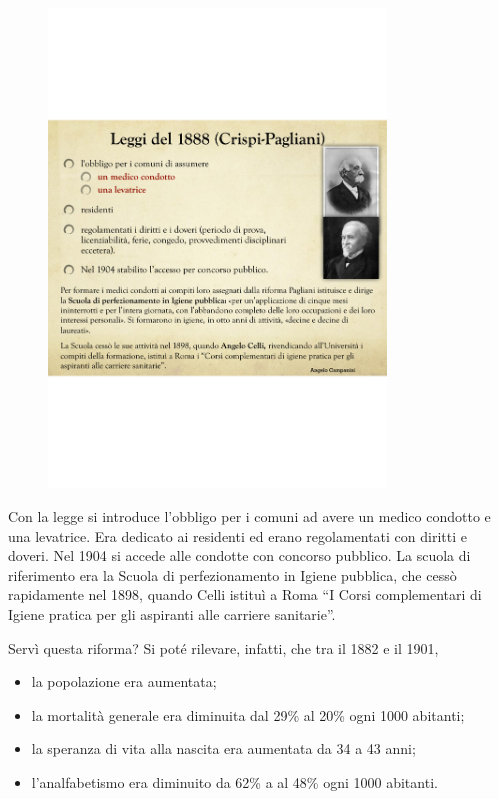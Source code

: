 \begin{figure}[!ht]
\centering
	\includegraphics[width=0.8\textwidth]{38/image2.png}
	\end{figure}
	
Con la legge si introduce l'obbligo per i comuni ad avere un medico
condotto e una levatrice. Era dedicato ai residenti ed erano
regolamentati con diritti e doveri. Nel 1904 si accede alle condotte con
concorso pubblico. La scuola di riferimento era la Scuola di
perfezionamento in Igiene pubblica, che cessò rapidamente nel 1898,
quando Celli istituì a Roma ``I Corsi complementari di Igiene pratica
per gli aspiranti alle carriere sanitarie''.

Servì questa riforma? Si poté rilevare, infatti, che tra il 1882 e il
1901,

\begin{itemize}
\item
  la popolazione era aumentata;
\item
  la mortalità generale era diminuita dal 29\% al 20\% ogni 1000
  abitanti;
\item
  la speranza di vita alla nascita era aumentata da 34 a 43 anni;
\item
  l'analfabetismo era diminuito da 62\% a al 48\% ogni 1000 abitanti.
\end{itemize}

